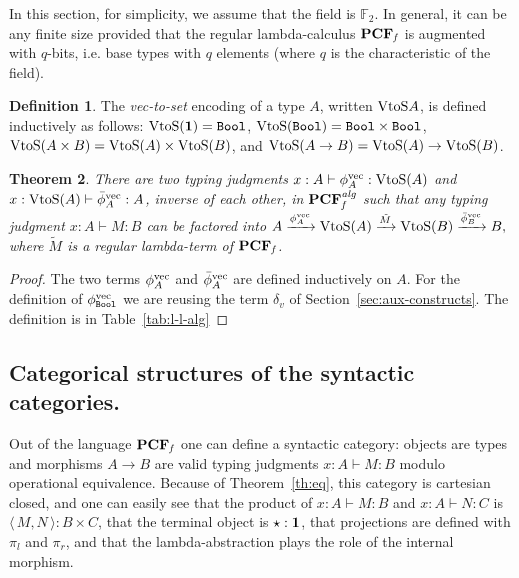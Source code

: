 \documentclass[10pt]{article}
\theoremstyle{plain}
\newtheorem{theorem}{Theorem}
\theoremstyle{definition}
\newtheorem{definition}[theorem]{Definition}
\newcommand{\entail}{\vdash}
\newcommand{\define}[1]{{\em #1}}
\newcommand{\vectoset}{{\rm VtoS}}
\newcommand{\pair}[1]{{\langle\,{#1}\,\rangle}}
\newcommand{\punit}{{\star}}
\newcommand{\tunit}{{\bf 1}}
\newcommand{\bit}{{\tt Bool}}
\begin{document}
In this section, for simplicity, we assume that the field
is $\mathbb{F}_2$. In general, it can be any finite size provided
that the regular lambda-calculus ${\bf PCF}_{\it f}$ is augmented with $q$-bits,
i.e. base types with $q$ elements (where $q$ is the characteristic of
the field).

\begin{definition}
  The \define{vec-to-set} encoding of a type $A$, written
  $\vectoset{A}$, is defined inductively as follows:
  $\vectoset(\tunit)=\bit$,
  $\vectoset(\bit)=\bit\times\bit$, $\vectoset(A\times
  B)=\vectoset(A)\times\vectoset(B)$, and $\vectoset(A\to
  B)=\vectoset(A)\to\vectoset(B)$.
\end{definition}

\begin{theorem}
  \label{th:l-l-alg}
  There are two typing judgments $x:A \vdash \phi^{\rm vec}_A :
  \vectoset(A)$ and $x:\vectoset(A)\vdash
  {\bar\phi}^{\rm vec}_A : A$, inverse of each other, in ${\bf PCF}_{\it f}^{\it
    alg}$ such that any typing judgment $x:A\vdash M:B$ can be
  factored into
  $
  A 
  \xrightarrow{\phi^{\rm vec}_A}
  \vectoset(A)
  \xrightarrow{\tilde{M}}
  \vectoset(B)
  \xrightarrow{\bar\phi^{\rm vec}_B}
  B,
  $
  where $\tilde{M}$ is a regular lambda-term of ${\bf PCF}_{\it f}$.
\end{theorem}
\begin{proof}
The two terms $\phi^{\rm vec}_A$ and $\bar\phi^{\rm vec}_A$ are
defined inductively on $A$.
For the definition of $\phi^{\rm vec}_{\bit}$ we are
reusing the term $\delta_v$ of Section~\ref{sec:aux-constructs}.
The definition is in Table~\ref{tab:l-l-alg}
\end{proof}

\subsection{Categorical structures of the syntactic categories.}
\label{sec:categ-struct-synt}

Out of the language ${\bf PCF}_{\it f}$ one can define a syntactic 
category: objects are
types and morphisms $A\to B$ are valid typing judgments $x:A\vdash M:B$ modulo
operational equivalence. 
Because of Theorem~\ref{th:eq}, this category is
cartesian closed, and one can easily see that the product of $x:A\entail M:B$
and $x:A\entail N:C$ is $\pair{M,N}:B\times C$, that the terminal
object is $\punit:\tunit$, that
projections are defined with $\pi_l$ and $\pi_r$, and that the
lambda-abstraction plays the role of the internal morphism.
\end{document}
